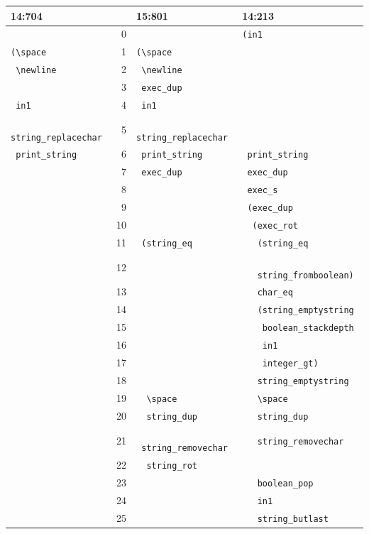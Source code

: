 \begin{table}
	\begin{tabular}{l|rl|l}
		\textbf{14:704} & & \textbf{15:801} & \textbf{14:213} \\
		\hline
		& 0 & & \texttt{(in1} \\ 
		\texttt{(\textbackslash space} & 1 & \texttt{(\textbackslash space} & \\ 
		\texttt{ \textbackslash newline} & 2 & \texttt{ \textbackslash newline} &  \\ 
		& 3 & \texttt{ exec\_dup} &  \\ 
		\texttt{ in1} & 4 & \texttt{ in1} &  \\ 
		\texttt{ string\_replacechar} & 5 & \texttt{ string\_replacechar} &  \\ 
		\texttt{ print\_string} & 6 & \texttt{ print\_string} & \texttt{ print\_string} \\ 
		& 7 & \texttt{ exec\_dup} & \texttt{ exec\_dup} \\ 
		& 8 &  & \texttt{ exec\_s} \\ 
		& 9 &  & \texttt{ (exec\_dup} \\ 
		& 10 &  & \texttt{ \ (exec\_rot} \\ 
		& 11 & \texttt{ (string\_eq} & \texttt{ \ \ (string\_eq} \\
		& 12 & &  \texttt{ \ \ \ string\_fromboolean)} \\ 
		& 13 &  & \texttt{ \ \ char\_eq} \\ 
		& 14 & & \texttt{ \ \ (string\_emptystring} \\
		& 15 & &  \texttt{ \ \ \ boolean\_stackdepth} \\
		& 16 & & \texttt{ \ \ \ in1} \\
		& 17 & & \texttt{ \ \ \ integer\_gt)} \\ 
		& 18 &  & \texttt{ \ \ string\_emptystring} \\ 
		& 19 & \texttt{ \ \textbackslash space} & \texttt{ \ \ \textbackslash space} \\ 
		& 20 & \texttt{ \ string\_dup} & \texttt{ \ \ string\_dup} \\ 
		& 21 & \texttt{ \ string\_removechar} & \texttt{ \ \ string\_removechar} \\
		& 22 & \texttt{ \ string\_rot} & \\
		& 23 & & \texttt{ \ \ boolean\_pop} \\ 
		& 24 &   & \texttt{ \ \ in1} \\ 
		& 25 &   & \texttt{ \ \ string\_butlast} \\ 

\end{tabular}
\end{table}
